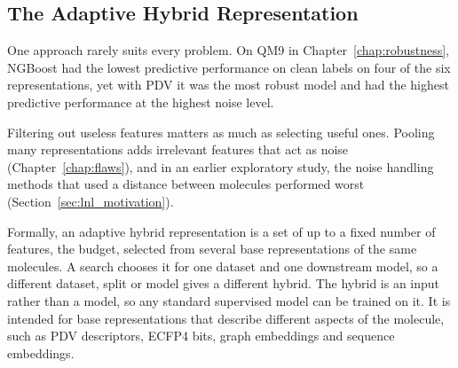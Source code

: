 \subsection{The Adaptive Hybrid Representation}


One approach rarely suits every problem. On QM9 in Chapter~\ref{chap:robustness}, NGBoost had the lowest predictive performance on clean labels on four of the six representations, yet with PDV it was the most robust model and had the highest predictive performance at the highest noise level.


Filtering out useless features matters as much as selecting useful ones. Pooling many representations adds irrelevant features that act as noise (Chapter~\ref{chap:flaws}), and in an earlier exploratory study, the noise handling methods that used a distance between molecules performed worst (Section~\ref{sec:lnl_motivation}).

Formally, an adaptive hybrid representation is a set of up to a fixed number of features, the budget, selected from several base representations of the same molecules. A search chooses it for one dataset and one downstream model, so a different dataset, split or model gives a different hybrid. The hybrid is an input rather than a model, so any standard supervised model can be trained on it. It is intended for base representations that describe different aspects of the molecule, such as PDV descriptors, ECFP4 bits, graph embeddings and sequence embeddings.

